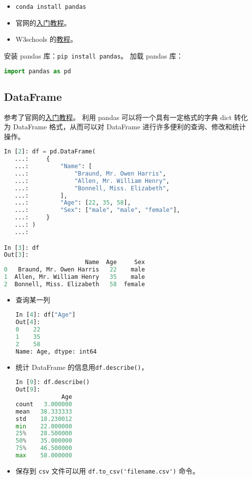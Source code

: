 
\begin{issues}
\issueDraft
\end{issues}

\begin{itemize}
\item \verb|conda install pandas|
\item 官网的\href{https://pandas.pydata.org/docs/getting_started/index.html}{入门教程}。
\item W3schools 的\href{https://www.w3schools.com/python/pandas/default.asp}{教程}。
\end{itemize}
安装 pandas 库：\verb|pip install pandas|。
加载 pandas 库：
\begin{lstlisting}[language=python]
import pandas as pd
\end{lstlisting}
\subsection{DataFrame}
参考了官网的\href{https://pandas.pydata.org/docs/getting_started/index.html}{入门教程}。
利用 pandas 可以将一个具有一定格式的字典 dict 转化为 DataFrame 格式，从而可以对 DataFrame 进行许多便利的查询、修改和统计操作。
\begin{lstlisting}[language=python]
In [2]: df = pd.DataFrame(
   ...:     {
   ...:         "Name": [
   ...:             "Braund, Mr. Owen Harris",
   ...:             "Allen, Mr. William Henry",
   ...:             "Bonnell, Miss. Elizabeth",
   ...:         ],
   ...:         "Age": [22, 35, 58],
   ...:         "Sex": ["male", "male", "female"],
   ...:     }
   ...: )
   ...: 

In [3]: df
Out[3]: 
                       Name  Age     Sex
0   Braund, Mr. Owen Harris   22    male
1  Allen, Mr. William Henry   35    male
2  Bonnell, Miss. Elizabeth   58  female
\end{lstlisting}
\begin{itemize}
\item 查询某一列
\begin{lstlisting}[language=python]
In [4]: df["Age"]
Out[4]: 
0    22
1    35
2    58
Name: Age, dtype: int64
\end{lstlisting}
\item 统计 DataFrame 的信息用\verb|df.describe()|，
\begin{lstlisting}[language=python]
In [9]: df.describe()
Out[9]: 
             Age
count   3.000000
mean   38.333333
std    18.230012
min    22.000000
25%    28.500000
50%    35.000000
75%    46.500000
max    58.000000
\end{lstlisting}
\item 保存到 \verb|csv| 文件可以用 \verb|df.to_csv('filename.csv')| 命令。
\end{itemize}
